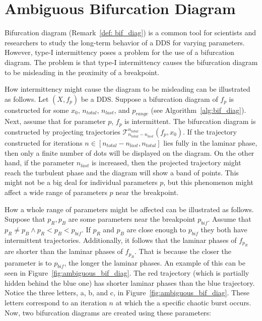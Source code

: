 \section{Ambiguous Bifurcation Diagram}
\label{sec:ambiguous_bif_diag}
Bifurcation diagram (Remark~\ref{def: bif_diag}) is a common tool for scientists and researchers to study the long-term behavior of a DDS for varying parameters.
However, type-I intermittency poses a problem for the use of a bifurcation diagram.
The problem is that type-I intermittency causes the bifurcation diagram to be misleading in the proximity of a breakpoint.
\par
How intermittency might cause the diagram to be misleading can be illustrated as follows.
Let $(X, f_{p})$ be a DDS.
Suppose a bifurcation diagram of $f_{p}$ is constructed for some $x_0$, $n_{total}$, $n_{last}$, and $p_{range}$ (see Algorithm~\ref{alg:bif_diag}).
Next, assume that for parameter $p$, $f_{p}$ is intermittent.
The bifurcation diagram is constructed by projecting trajectories $\mathcal{T}_{n_{total}-n_{last}}^{n_{total}}(f_{p}, x_0)$.
If the trajectory constructed for iterations $n \in [n_{total}-n_{last}, n_{total}]$ lies fully in the laminar phase, then only a finite number of dots will be displayed on the diagram.
On the other hand, if the parameter $n_{last}$ is increased, then the projected trajectory might reach the turbulent phase and the diagram will show a band of points.
This might not be a big deal for individual parameters $p$, but this phenomenon might affect a wide range of parameters $p$ near the breakpoint.
\par
How a whole range of parameters might be affected can be illustrated as follows.
Suppose that $p_{R}, p_{B}$ are some parameters near the breakpoint $p_{bif}$.
Assume that $p_{R} \neq p_{B} \wedge p_{R} < p_{B} < p_{bif}$.
If $p_{R}$ and $p_{B}$ are close enough to $p_{bif}$ they both have intermittent trajectories.
Additionally, it follows that the laminar phases of $f_{p_{R}}$ are shorter than the laminar phases of $f_{p_{B}}$.
That is because the closer the parameter is to $p_{bif}$, the longer the laminar phases.
An example of this can be seen in Figure~\ref{fig:ambiguous_bif_diag}.
The red trajectory (which is partially hidden behind the blue one) has shorter laminar phases than the blue trajectory.
Notice the three letters, a, b, and c, in Figure~\ref{fig:ambiguous_bif_diag}.
These letters correspond to an iteration $n$ at which the a specific chaotic burst occurs.
Now, two bifurcation diagrams are created using these parameters:

